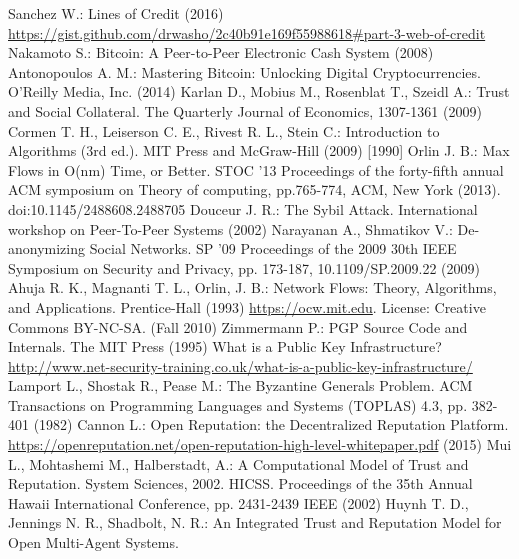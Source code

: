 \documentclass[11pt]{llncs}
\theoremstyle{definition}
\begin{document}
  \begin{thebibliography}{40}
     Sanchez W.: Lines of Credit (2016) \url{https://gist.github.com/drwasho/2c40b91e169f55988618#part-3-web-of-credit}
     Nakamoto S.: Bitcoin: A Peer-to-Peer Electronic Cash System (2008)
     Antonopoulos A. M.: Mastering Bitcoin: Unlocking Digital Cryptocurrencies. O'Reilly Media, Inc. (2014)
     Karlan D., Mobius M., Rosenblat T., Szeidl A.: Trust and Social Collateral. The Quarterly Journal of Economics,
     1307-1361 (2009)
     Cormen T. H., Leiserson C. E., Rivest R. L., Stein C.: Introduction to Algorithms (3rd ed.). MIT Press and McGraw-Hill
     (2009) [1990]
     Orlin J. B.: Max Flows in O(nm) Time, or Better. STOC '13 Proceedings of the forty-fifth annual ACM symposium on Theory
     of computing, pp.765-774, ACM, New York (2013). doi:10.1145/2488608.2488705
     Douceur J. R.: The Sybil Attack. International workshop on Peer-To-Peer Systems (2002)
     Narayanan A., Shmatikov V.: De-anonymizing Social Networks. SP '09 Proceedings of the 2009 30th IEEE Symposium on
     Security and Privacy, pp. 173-187, 10.1109/SP.2009.22 (2009)
     Ahuja R. K., Magnanti T. L., Orlin, J. B.: Network Flows: Theory, Algorithms, and Applications. Prentice-Hall (1993)
     \url{https://ocw.mit.edu}. License: Creative Commons BY-NC-SA. (Fall 2010)
     Zimmermann P.: PGP Source Code and Internals. The MIT Press (1995)
     What is a Public Key Infrastructure? \url{http://www.net-security-training.co.uk/what-is-a-public-key-infrastructure/}
     Lamport L., Shostak R., Pease M.: The Byzantine Generals Problem. ACM Transactions on Programming Languages and Systems
     (TOPLAS) 4.3, pp. 382-401 (1982)
     Cannon L.: Open Reputation: the Decentralized Reputation Platform.
     \url{https://openreputation.net/open-reputation-high-level-whitepaper.pdf} (2015)
     Mui L., Mohtashemi M., Halberstadt, A.: A Computational Model of Trust and Reputation. System Sciences, 2002. HICSS.
     Proceedings of the 35th Annual Hawaii International Conference, pp. 2431-2439 IEEE (2002)
     Huynh T. D., Jennings N. R., Shadbolt, N. R.: An Integrated Trust and Reputation Model for Open Multi-Agent Systems.

\end{thebibliography}
\end{document}

